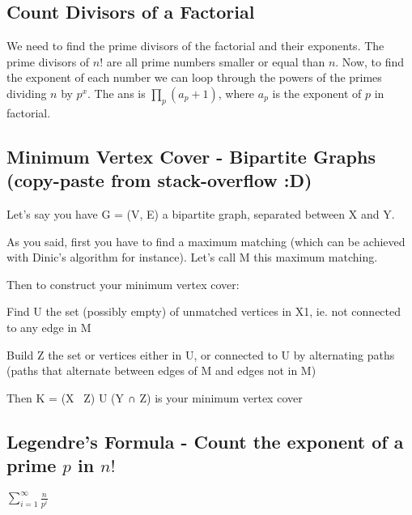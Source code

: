 \documentclass[12pt]{article}%
\begin{document}
\subsection{Count Divisors of a Factorial}

We need to find the prime divisors of the factorial and their exponents. The prime divisors of $n!$ are all prime numbers smaller or equal than $n$. Now, to find the exponent of each number we can loop through the powers of the primes dividing $n$ by $p^x$. The ans is $\prod_{p} (a_p+1)$, where $a_p$ is the exponent of $p$ in factorial.

\subsection{Minimum Vertex Cover - Bipartite Graphs (copy-paste from stack-overflow :D)}

Let's say you have G = (V, E) a bipartite graph, separated between X and Y.

As you said, first you have to find a maximum matching (which can be achieved with Dinic's algorithm for instance). Let's call M this maximum matching.

Then to construct your minimum vertex cover:

Find U the set (possibly empty) of unmatched vertices in X1, ie. not connected to any edge in M

Build Z the set or vertices either in U, or connected to U by alternating paths (paths that alternate between edges of M and edges not in M)

Then K = (X \ Z) U (Y ∩ Z) is your minimum vertex cover

\subsection{Legendre's Formula - Count the exponent of a prime $p$ in $n!$}

$\sum_{i = 1}^{\infty} \frac{n}{p^{i}}$
\end{document}
